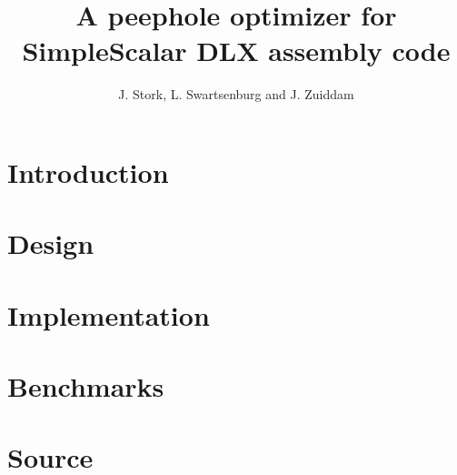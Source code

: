 \documentclass{scrreprt}
\title{A peephole optimizer for SimpleScalar DLX assembly code}
\author{J. Stork, L. Swartsenburg and J. Zuiddam}
\begin{document}
\maketitle
\chapter{Introduction}
\chapter{Design}
\chapter{Implementation}
\chapter{Benchmarks}
\appendix
\chapter{Source}
\end{document}

